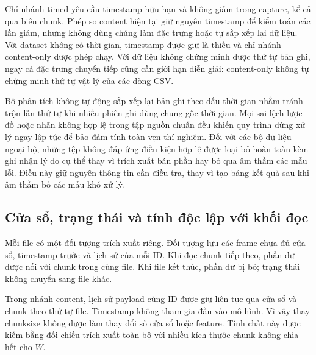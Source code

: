 \documentclass[12pt, a4paper, reqno, oneside]{book}
\begin{document}
Chỉ nhánh timed yêu cầu timestamp hữu hạn và không giảm trong capture, kể cả qua biên chunk. Phép so content hiện tại giữ nguyên timestamp để kiểm toán các lần giảm, nhưng không dùng chúng làm đặc trưng hoặc tự sắp xếp lại dữ liệu. Với dataset không có thời gian, timestamp được giữ là thiếu và chỉ nhánh content-only được phép chạy. Với dữ liệu không chứng minh được thứ tự bản ghi, ngay cả đặc trưng chuyển tiếp cũng cần giới hạn diễn giải: content-only không tự chứng minh thứ tự vật lý của các dòng CSV.

Bộ phân tích không tự động sắp xếp lại bản ghi theo dấu thời gian nhằm tránh trộn lẫn thứ tự khi nhiều phiên ghi dùng chung gốc thời gian. Mọi sai lệch lược đồ hoặc nhãn không hợp lệ trong tập nguồn chuẩn đều khiến quy trình dừng xử lý ngay lập tức để bảo đảm tính toàn vẹn thí nghiệm. Đối với các bộ dữ liệu ngoại bộ, những tệp không đáp ứng điều kiện hợp lệ được loại bỏ hoàn toàn kèm ghi nhận lý do cụ thể thay vì trích xuất bán phần hay bỏ qua âm thầm các mẫu lỗi. Điều này giữ nguyên thông tin cần điều tra, thay vì tạo bảng kết quả sau khi âm thầm bỏ các mẫu khó xử lý.

\subsection{Cửa sổ, trạng thái và tính độc lập với khối đọc}
Mỗi file có một đối tượng trích xuất riêng. Đối tượng lưu các frame chưa đủ cửa sổ, timestamp trước và lịch sử của mỗi ID. Khi đọc chunk tiếp theo, phần dư được nối với chunk trong cùng file. Khi file kết thúc, phần dư bị bỏ; trạng thái không chuyển sang file khác.

Trong nhánh content, lịch sử payload cùng ID được giữ liên tục qua cửa sổ và chunk theo thứ tự file. Timestamp không tham gia đầu vào mô hình. Vì vậy thay chunksize không được làm thay đổi số cửa sổ hoặc feature. Tính chất này được kiểm bằng đối chiếu trích xuất toàn bộ với nhiều kích thước chunk không chia hết cho $W$.
\end{document}
